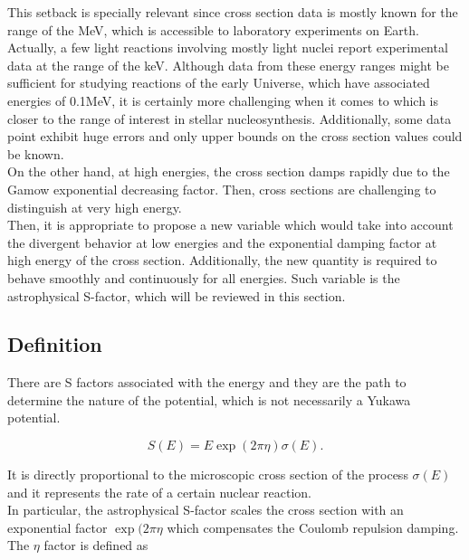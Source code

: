 \documentclass[openany]{book}
\begin{document}
This setback is specially relevant since cross section data is mostly known for the range of the MeV, which is accessible to laboratory experiments on Earth. Actually, a few light reactions involving mostly light nuclei report experimental data at the range of the keV. Although data from these energy ranges might be sufficient for studying reactions of the early Universe, which have associated energies of 0.1MeV, it is certainly more challenging when it comes to  which is closer to the range of interest in stellar nucleosynthesis. Additionally, some data point exhibit huge errors and only upper bounds on the cross section values could be known. \\

On the other hand, at high energies, the cross section damps rapidly due to the Gamow exponential decreasing factor. Then, cross sections are challenging to distinguish at very high energy. \\ 

Then, it is appropriate to propose a new variable which would take into account the divergent behavior at low energies and the exponential damping factor at high energy of the cross section. Additionally, the new quantity is required to behave smoothly and continuously for all energies. Such variable is the astrophysical S-factor, which will be reviewed in this section. 

\subsection{Definition} \label{sub:sfactorMotivationDefinition}

There are S factors associated with the energy and they are the path to determine the nature of the potential, which is not necessarily a Yukawa potential.

\begin{equation} \label{eq:sfactor_definition}
	S(E) = E \exp({2\pi\eta}) \sigma({E}).
\end{equation} %

It is directly proportional to the microscopic cross section of the process $\sigma(E)$ and it represents the rate of a certain nuclear reaction.  \\

In particular, the astrophysical S-factor scales the cross section with an exponential factor $\exp({2\pi\eta}$ which compensates the Coulomb repulsion damping. The $\eta$ factor is defined as 
\end{document}
